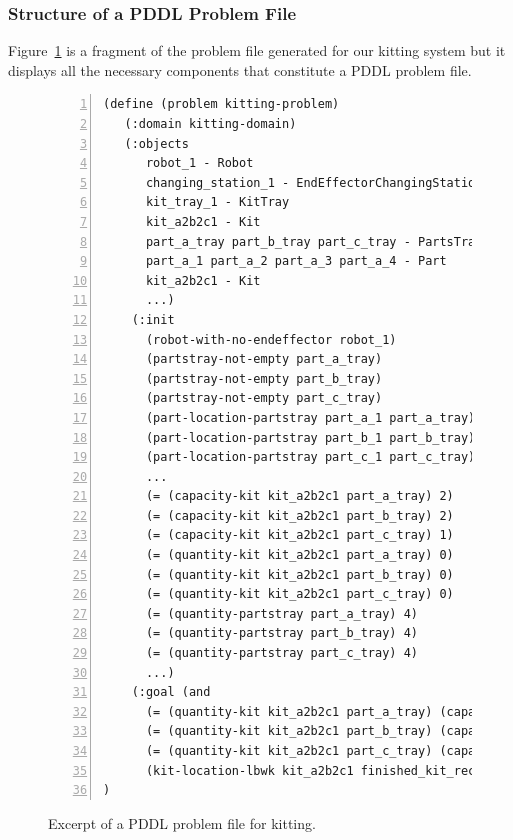 \subsubsection{Structure of a PDDL Problem File}
Figure~\ref{fig:problem} is a fragment of the problem file generated for our kitting system but it displays all the necessary components that constitute a PDDL problem file.

\begin{figure}[t!h!]
\begin{minipage}{.7\paperwidth}
\begin{mylisting}
\begin{Verbatim}[commandchars=\\\{\},fontsize=\scriptsize, numbers=left, numbersep=2pt]
(define (problem kitting-problem)
   (:domain kitting-domain)
   (:objects
      robot_1 - Robot
      changing_station_1 - EndEffectorChangingStation
      kit_tray_1 - KitTray
      kit_a2b2c1 - Kit
      part_a_tray part_b_tray part_c_tray - PartsTray
      part_a_1 part_a_2 part_a_3 part_a_4 - Part
      kit_a2b2c1 - Kit
      ...)
    (:init
      (robot-with-no-endeffector robot_1)
      (partstray-not-empty part_a_tray)
      (partstray-not-empty part_b_tray)
      (partstray-not-empty part_c_tray)
      (part-location-partstray part_a_1 part_a_tray)
      (part-location-partstray part_b_1 part_b_tray)
      (part-location-partstray part_c_1 part_c_tray)
      ...
      (= (capacity-kit kit_a2b2c1 part_a_tray) 2)
      (= (capacity-kit kit_a2b2c1 part_b_tray) 2)
      (= (capacity-kit kit_a2b2c1 part_c_tray) 1)
      (= (quantity-kit kit_a2b2c1 part_a_tray) 0)
      (= (quantity-kit kit_a2b2c1 part_b_tray) 0)
      (= (quantity-kit kit_a2b2c1 part_c_tray) 0)
      (= (quantity-partstray part_a_tray) 4)
      (= (quantity-partstray part_b_tray) 4)
      (= (quantity-partstray part_c_tray) 4)
      ...)
    (:goal (and
      (= (quantity-kit kit_a2b2c1 part_a_tray) (capacity-kit kit_a2b2c1 part_a_tray))
      (= (quantity-kit kit_a2b2c1 part_b_tray) (capacity-kit kit_a2b2c1 part_b_tray))
      (= (quantity-kit kit_a2b2c1 part_c_tray) (capacity-kit kit_a2b2c1 part_c_tray))
      (kit-location-lbwk kit_a2b2c1 finished_kit_receiver))
)
\end{Verbatim}
\end{mylisting}
\end{minipage}
\caption{Excerpt of a PDDL problem file for kitting.}
\label{fig:problem}
\end{figure}

